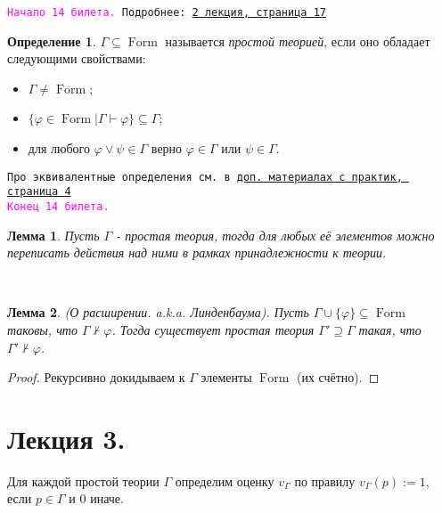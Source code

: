 \documentclass[a4paper,100pt]{article}
\theoremstyle{indented}
\newtheorem{lemma}{Лемма}
\theoremstyle{definition}
\newtheorem{defn}{Определение}
\theoremstyle{remark}
\DeclareMathOperator{\form}{Form}
\begin{document}
\texttt{\hypertarget{b14}{\textcolor{magenta}{Начало 14 билета.}} Подробнее: \href{http://www.mi-ras.ru/~speranski/courses/logic-1-2021-spring/slides_2.pdf}{2 лекция, страница 17}} 

\begin{defn}
  $\Gamma \subseteq \form$ называется \textit{простой теорией}, если оно обладает следующими свойствами:

  \begin{itemize}
    \item $\Gamma \neq \form$; 
    \item $\{\varphi \in \form |\Gamma \vdash \varphi\}\subseteq \Gamma$; 
    \item для любого $\varphi \vee \psi \in \Gamma$ верно $\varphi \in \Gamma$ или $\psi \in \Gamma$. 
  \end{itemize}
\end{defn}

\texttt{Про эквивалентные определения см. в \href{http://www.mi-ras.ru/~speranski/courses/logic-1-2021-spring/slides-more_pcl.pdf}{доп. материалах с практик, страница 4}} \\ 

\texttt{\textcolor{magenta}{Конец 14 билета.}} 

\hrulefill


\begin{lemma}
  Пусть $\Gamma$ - простая теория, тогда для любых её элементов можно переписать действия над ними в рамках принадлежности к теории.
\end{lemma}\

\begin{lemma}
  (О расширении. a.k.a. Линденбаума). Пусть $\Gamma \cup \{\varphi \}\subseteq \form$ таковы, что $\Gamma \nvdash \varphi$. Тогда существует простая теория $\Gamma'\supseteq \Gamma$ такая, что $\Gamma' \nvdash \varphi$.
\end{lemma}

\begin{proof}
  Рекурсивно докидываем к $\Gamma$ элементы $\form$ (их счётно).
\end{proof}

\section{Лекция 3.}

Для каждой простой теории $\Gamma$ определим оценку $v_\Gamma$ по правилу $v_\Gamma(p):=1$, если $p\in \Gamma$ и 0 иначе. \\
\end{document}
